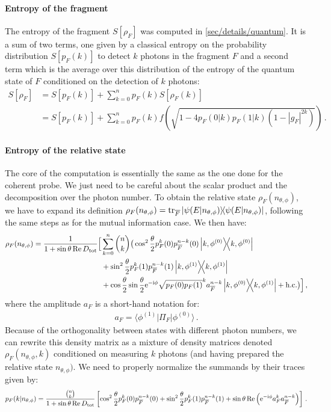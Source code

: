 \paragraph{Entropy of the fragment} The entropy of the
fragment $S[\rho_F]$ was computed in \cref{sec/details/quantum}. It is a sum
of two terms, one given by a classical entropy on the probability distribution
$S[p_F(k)]$ to detect $k$ photons in the fragment $F$ and a second
term which is the average over this distribution of the entropy of
the quantum state of $F$ conditioned on the detection of $k$ photons:
%
\begin{align}
S[\rho_F] &= S[p_F(k)] + 
	\sum_{k=0}^n p_F(k) S[\rho_F(k)] \\
&= S[p_F(k)] + 
	\sum_{k=0}^n p_F(k)
	f\left(\sqrt{1-4p_F(0|k)p_F(1|k)(1-|g_F|^{2k})}\right)
\,.
\end{align}

\paragraph{Entropy of the relative state} The core of the computation
is essentially the same as the one done for the coherent probe. 
We just need to be careful about the scalar product and the 
decomposition over the photon number. To obtain
the relative state $\rho_F(n_{\theta,\phi})$, we have to expand its definition
$\rho_F(n_{\theta,\phi}) = \trace_{\overline{F}} \ketbra{\psi(E|n_{\theta,\phi})}$,
following the same steps as for the mutual information case. We then
have:
%
\begin{align}
\rho_F(n_{\theta,\phi}) =  \frac{1}{1 + \sin\theta \Re D_{\text{tot}}}
\Big[ 
	&\sum_{k=0}^n \binom{n}{k} \big( 
	\cos^2\frac{\theta}{2} 
		p^k_F(0) p^{n-k}_{\overline{F}}(0)
		\ketbra{k , \phi^{(0)}} \nonumber \\
	&+ \sin^2\frac{\theta}{2} 
		p^k_F(1) p^{n-k}_{\overline{F}}(1)
		\ketbra{k , \phi^{(1)}} \nonumber \\
	&+ 	\cos\frac{\theta}{2} 	\sin\frac{\theta}{2} \mathrm{e}^{-\mathrm{i} \phi}
		  \sqrt{p_F(0) p_F(1)}^k
			a_{\overline{F}}^{n-k} \ketbra{k , \phi^{(0)}}{k , \phi^{(1)}}
		+ \text{h.c.}
	\big)
\Big]
\,,
\end{align}
where the amplitude $a_F$ is a short-hand notation for:
%
\begin{align}
a_F=\langle \phi^{(1)}|\Pi_F|\phi^{(0)}\rangle
\,.
\label{eq/amplitude}
\end{align}
Because of the orthogonality between states with different photon numbers,
we can rewrite this density matrix as a mixture of density matrices 
denoted $\rho_F(n_{\theta,\phi},k)$ conditioned on measuring $k$ photons
(and having prepared the relative state $n_{\theta,\phi})$. We need to 
properly normalize the summands by their traces given by:
%
\begin{align}
p_F(k|n_{\theta,\phi}) = \frac{\binom{n}{k}}{1 + \sin\theta \Re D_{\text{tot}}}
\left[
	\cos^2\frac{\theta}{2} p^k_F(0) p^{n-k}_{\overline{F}}(0) + 
	\sin^2\frac{\theta}{2} p^k_F(1) p^{n-k}_{\overline{F}}(1) + 
	\sin\theta \Re\left( \mathrm{e}^{-\mathrm{i} \phi} a_F^k a_{\overline{F}}^{n-k}\right)
\right]
\,.
\end{align}

